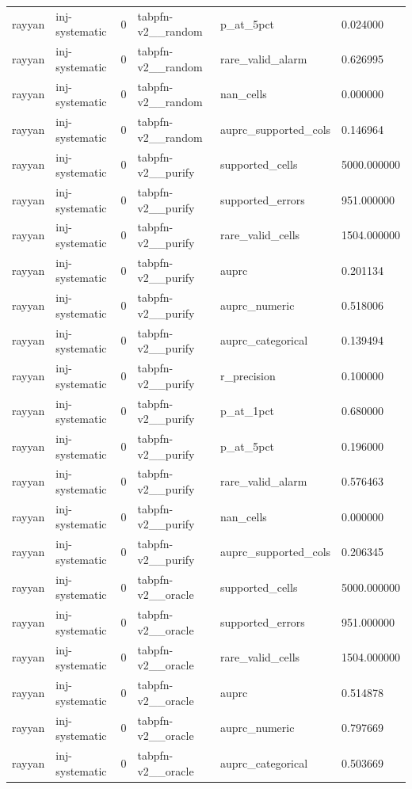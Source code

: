 \begin{tabular}{llllll}
rayyan & inj-systematic & 0 & tabpfn-v2\_\_random & p\_at\_5pct & 0.024000 \\
rayyan & inj-systematic & 0 & tabpfn-v2\_\_random & rare\_valid\_alarm & 0.626995 \\
rayyan & inj-systematic & 0 & tabpfn-v2\_\_random & nan\_cells & 0.000000 \\
rayyan & inj-systematic & 0 & tabpfn-v2\_\_random & auprc\_supported\_cols & 0.146964 \\
rayyan & inj-systematic & 0 & tabpfn-v2\_\_purify & supported\_cells & 5000.000000 \\
rayyan & inj-systematic & 0 & tabpfn-v2\_\_purify & supported\_errors & 951.000000 \\
rayyan & inj-systematic & 0 & tabpfn-v2\_\_purify & rare\_valid\_cells & 1504.000000 \\
rayyan & inj-systematic & 0 & tabpfn-v2\_\_purify & auprc & 0.201134 \\
rayyan & inj-systematic & 0 & tabpfn-v2\_\_purify & auprc\_numeric & 0.518006 \\
rayyan & inj-systematic & 0 & tabpfn-v2\_\_purify & auprc\_categorical & 0.139494 \\
rayyan & inj-systematic & 0 & tabpfn-v2\_\_purify & r\_precision & 0.100000 \\
rayyan & inj-systematic & 0 & tabpfn-v2\_\_purify & p\_at\_1pct & 0.680000 \\
rayyan & inj-systematic & 0 & tabpfn-v2\_\_purify & p\_at\_5pct & 0.196000 \\
rayyan & inj-systematic & 0 & tabpfn-v2\_\_purify & rare\_valid\_alarm & 0.576463 \\
rayyan & inj-systematic & 0 & tabpfn-v2\_\_purify & nan\_cells & 0.000000 \\
rayyan & inj-systematic & 0 & tabpfn-v2\_\_purify & auprc\_supported\_cols & 0.206345 \\
rayyan & inj-systematic & 0 & tabpfn-v2\_\_oracle & supported\_cells & 5000.000000 \\
rayyan & inj-systematic & 0 & tabpfn-v2\_\_oracle & supported\_errors & 951.000000 \\
rayyan & inj-systematic & 0 & tabpfn-v2\_\_oracle & rare\_valid\_cells & 1504.000000 \\
rayyan & inj-systematic & 0 & tabpfn-v2\_\_oracle & auprc & 0.514878 \\
rayyan & inj-systematic & 0 & tabpfn-v2\_\_oracle & auprc\_numeric & 0.797669 \\
rayyan & inj-systematic & 0 & tabpfn-v2\_\_oracle & auprc\_categorical & 0.503669 \\

\end{tabular}
